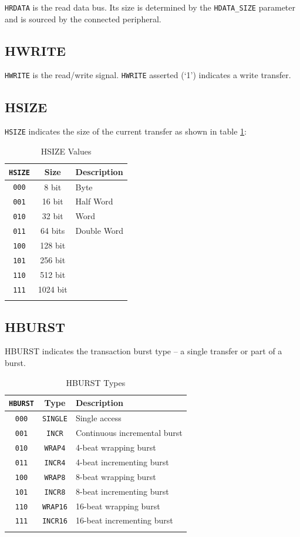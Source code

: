 \texttt{HRDATA} is the read data bus. Its size is determined by the
\texttt{HDATA\_SIZE} parameter and is sourced by the connected
peripheral.

\subsection{HWRITE}

\texttt{HWRITE} is the read/write signal. \texttt{HWRITE} asserted (`1')
indicates a write transfer.

\subsection{HSIZE}

\texttt{HSIZE} indicates the size of the current transfer as shown in table \ref{tab:HSIZE}:

\begin{longtable}[c]{@{\extracolsep{\fill}}ccl}	
	\toprule 
	\textbf{\texttt{HSIZE}} & \textbf{Size} & \textbf{Description}\\
	\midrule
	\endhead 
	\texttt{000} & 8 bit    & Byte\\
	\texttt{001} & 16 bit   & Half Word\\
	\texttt{010} & 32 bit   & Word\\
	\texttt{011} & 64 bits  & Double Word\\
	\texttt{100} & 128 bit  &\\
	\texttt{101} & 256 bit  &\\
	\texttt{110} & 512 bit  &\\
	\texttt{111} & 1024 bit &\\
	\bottomrule 	
	\caption{HSIZE Values}
	\label{tab:HSIZE}
\end{longtable}

\subsection{HBURST}

HBURST indicates the transaction burst type -- a single transfer or part
of a burst.

\begin{longtable}[c]{@{\extracolsep{\fill}}ccl}	
	\toprule 
	\textbf{\texttt{HBURST}} & \textbf{Type} & \textbf{Description}\\
	\midrule
	\endhead 
	\texttt{000} & \texttt{SINGLE} & Single access\\
	\texttt{001} & \texttt{INCR}   & Continuous incremental burst\\
	\texttt{010} & \texttt{WRAP4}  & 4-beat wrapping burst\\
	\texttt{011} & \texttt{INCR4}  & 4-beat incrementing burst\\
	\texttt{100} & \texttt{WRAP8}  & 8-beat wrapping burst\\
	\texttt{101} & \texttt{INCR8}  & 8-beat incrementing burst\\
	\texttt{110} & \texttt{WRAP16} & 16-beat wrapping burst\\
	\texttt{111} & \texttt{INCR16} & 16-beat incrementing burst\\
	\bottomrule 	
	\caption{HBURST Types}
	\label{tab:HBURST}
\end{longtable}

